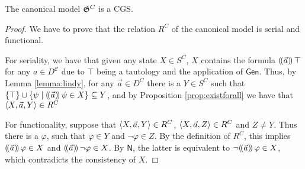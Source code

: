 \documentclass[sigconf,anonymous]{aamas}
\begin{document}
\begin{proposition}
The canonical model $\mathfrak{G}^C$ is a CGS.
\end{proposition}
\begin{proof}
    We have to prove that the relation $R^C$ of the canonical model is serial and functional. 
    
    For seriality, we have that given any state $X \in S^C$, %
    $X$ contains the formula $(\!( \vec{a} )\!)\,\top$ for any $a\in D^\mathcal{C}$ %
    due to $\top$ being a tautology and the application of $\mathsf{Gen}$.
    Thus, by Lemma \ref{lemma:lindy}, for any $\vec{a}\in D^C$ there is a $Y\in S^C$ such that $\{\top\}\cup \{\psi \mid  (\!( \vec a )\!)\, \psi\in X\} \subseteq Y $, and by Proposition \ref{prop:existforall} we have that $\langle X,\vec{a},Y \rangle\in R^C$

    For functionality, suppose that $\langle X,\vec{a},Y \rangle\in R^C$, $\langle X,\vec{a},Z \rangle\in R^C$ and $Z\neq Y$. Thus there is a $\varphi$, such that $\varphi\in Y$ and $\neg \varphi \in Z$. By the definition of $R^C$, this implies $(\!( \vec{a} )\!)\,\varphi \in X$ and $(\!( \vec a )\!)\, \neg \varphi \in X$.
    By $\mathsf{N}$, the latter is equivalent to $\neg (\!( \vec a )\!)\,\varphi \in X$, which contradicts the consistency of $X$.
\end{proof}



 
\end{document}
